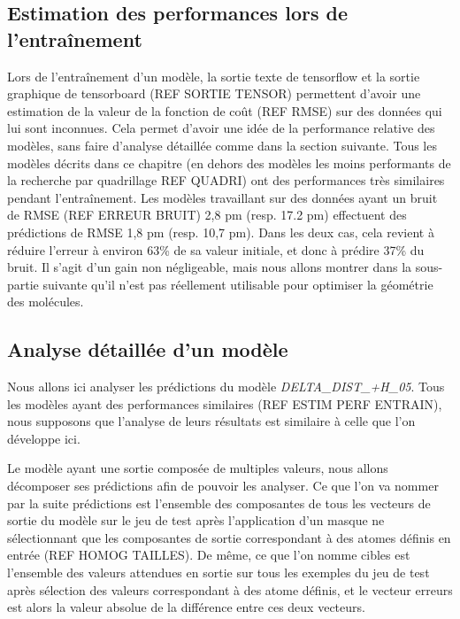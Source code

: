 \subsection{Estimation des performances lors de l'entraînement}

Lors de l'entraînement d'un modèle, la sortie texte de tensorflow et la sortie graphique de tensorboard (REF SORTIE TENSOR) permettent d'avoir une estimation de la valeur de la fonction de coût (REF RMSE) sur des données qui lui sont inconnues. Cela permet d'avoir une idée de la performance relative des modèles, sans faire d'analyse détaillée comme dans la section suivante. Tous les modèles décrits dans ce chapitre (en dehors des modèles les moins performants de la recherche par quadrillage REF QUADRI) ont des performances très similaires pendant l'entraînement. Les modèles travaillant sur des données ayant un bruit de RMSE (REF ERREUR BRUIT) 2,8 pm (resp. 17.2 pm) effectuent des prédictions de RMSE 1,8 pm (resp. 10,7 pm). Dans les deux cas, cela revient à réduire l'erreur à environ 63\% de sa valeur initiale, et donc à prédire 37\% du bruit. Il s'agit d'un gain non négligeable, mais nous allons montrer dans la sous-partie suivante qu'il n'est pas réellement utilisable pour optimiser la géométrie des molécules.

\subsection{Analyse détaillée d'un modèle}

\par Nous allons ici analyser les prédictions du modèle \emph{DELTA\_DIST\_+H\_05}. Tous les modèles ayant des performances similaires (REF ESTIM PERF ENTRAIN), nous supposons que l'analyse de leurs résultats est similaire à celle que l'on développe ici.

\par Le modèle ayant une sortie composée de multiples valeurs, nous allons décomposer ses prédictions afin de pouvoir les analyser. Ce que l'on va nommer par la suite prédictions est l'ensemble des composantes de tous les vecteurs de sortie du modèle sur le jeu de test après l'application d'un masque ne sélectionnant que les composantes de sortie correspondant à des atomes définis en entrée (REF HOMOG TAILLES). De même, ce que l'on nomme cibles est l'ensemble des valeurs attendues en sortie sur tous les exemples du jeu de test après sélection des valeurs correspondant à des atome définis, et le vecteur erreurs est alors la valeur absolue de la différence entre ces deux vecteurs.


